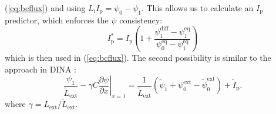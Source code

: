 (\ref{eq:bcflux}) and using ${L_{\text{i}}}{I_{\text{p}}} = {\psi _0} - {\psi _1}$.
This allows us to calculate an $I_{\text{p}}$ predictor, which enforces
the $\psi$ consistency:
\begin{equation}
I_{\text{p}}^ *  = {I_{\text{p}}}\left( {1 + \frac{{\psi _1^{{\text{diff}}} - \psi _1^{{\text{eq}}}}}{{\psi _0^{{\text{eq}}} - \psi _1^{{\text{eq}}}}}} \right)
\end{equation}
which is then used in (\ref{eq:bcflux}).
The second possibility is similar to the approach in DINA \cite{DINA1993}:
\begin{equation}
\label{eq:bcdina}
\frac{{{\psi _{\text{1}}}}}{{{{\tilde L}_{{\text{ext}}}}}} - \gamma C{\left. {\frac{{\partial \psi }}{{\partial x }}} \right|_{x  = 1}} = \frac{1}{{{{\tilde L}_{{\text{ext}}}}}}\left( {{{\tilde \psi }_{\text{1}}} + \psi _{\text{0}}^{{\text{ext}}} - \tilde \psi _{\text{0}}^{{\text{ext}}}} \right) + {\tilde I_{\text{p}}}.
\end{equation}
where $\gamma  = {L_{{\text{ext}}}}/{\tilde L_{{\text{ext}}}}$.



